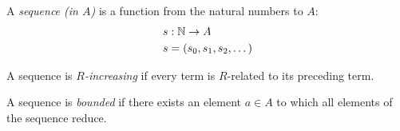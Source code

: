 





\begin{definition}
    A \emph{sequence (in $A$)} is a function from the natural numbers to $A$:
    \begin{align*}
      &s : \mathbb{N} \to A \\
      &s = (s_0,s_1,s_2,\dots)
    \end{align*}
\end{definition}

\begin{definition}
    A sequence is \emph{$R$-increasing} if every term is $R$-related to its preceding term.
\end{definition}

\begin{definition}
    A sequence is \emph{bounded} if there exists an element $a \in A$ to which all elements of the sequence reduce.
\end{definition}



